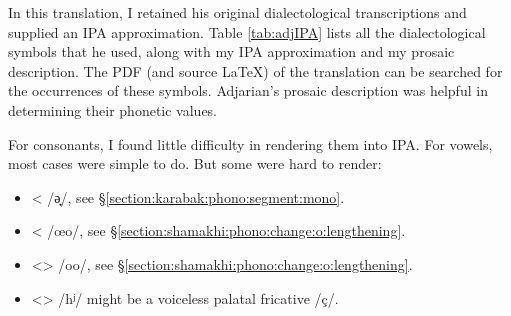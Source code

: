 In this translation, I retained his original dialectological transcriptions and supplied  an IPA approximation. Table \ref{tab:adjIPA}  lists all the dialectological symbols that he used, along with my IPA approximation and my  prosaic description. The PDF (and source LaTeX) of the translation can be searched for the occurrences of these symbols. Adjarian's prosaic description was  helpful in determining their phonetic values.  

For consonants, I found little difficulty in rendering them into IPA. For vowels, most cases were simple to do. But some were hard to render:  
\begin{itemize}
	\item < /ə̟/,  see \S\ref{section:karabak:phono:segment:mono}. 
	\item < /œo/,  see \S\ref{section:shamakhi:phono:change:o:lengthening}. 
	\item <> /oo/,  see \S\ref{section:shamakhi:phono:change:o:lengthening}.
	 \item <> /hʲ/ might be a voiceless palatal fricative /ç/.
\end{itemize}


